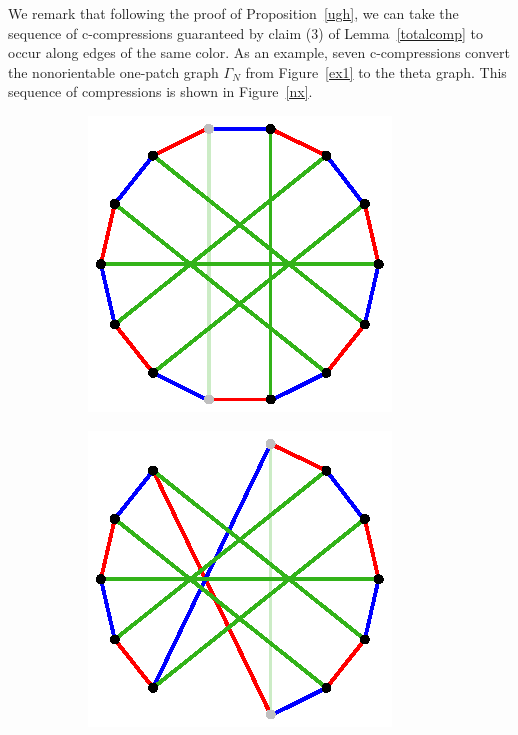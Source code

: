 \documentclass[11pt, oneside]{amsart}
\theoremstyle{theorem}
\theoremstyle{definition}
\theoremstyle{theorem}
\begin{document}
We remark that following the proof of Proposition~\ref{ugh}, we can take the sequence of c-compressions guaranteed by claim (3) of Lemma~\ref{totalcomp} to occur along edges of the same color.  As an example, seven c-compressions convert the nonorientable one-patch graph $\Gamma_N$ from Figure~\ref{ex1} to the theta graph.  This sequence of compressions is shown in Figure~\ref{nx}.

\begin{figure}[h!]
\begin{subfigure}{.24\textwidth}
  \centering
  \includegraphics[width=.9\linewidth]{nonex1.eps}
  \label{nx1}
\end{subfigure}%
\begin{subfigure}{.24\textwidth}
  \centering
  \includegraphics[width=.9\linewidth]{nonex2.eps}

\end{subfigure}
\end{figure}
\end{document}
